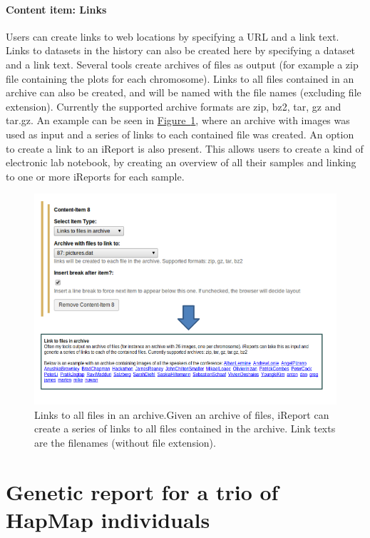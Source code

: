 \paragraph*{Content item: Links}
Users can create links to web locations by specifying a URL and a link text. Links to datasets in the history can also be created here by specifying a dataset and a link text. Several tools create archives of files as output (for example a zip file containing the plots for each chromosome). Links to all files contained in an archive can also be created, and will be named with the file names (excluding file extension). Currently the supported archive formats are zip, bz2, tar, gz and tar.gz. An example can be seen in \hyperref[fig:archivelinks]{Figure~\ref*{fig:archivelinks}}, where an archive with images was used as input and a series of links to each contained file was created. An option to create a link to an iReport is also present. This allows users to create a kind of electronic lab notebook, by creating an overview of all their samples and linking to one or more iReports for each sample.

\begin{figure}[h!]
    \includegraphics[width=\textwidth]{chapters/images/iReport/Hiltemann_archivelinks.jpg}
    \caption{Links to all files in an archive.Given an archive of files, iReport can create a series of links to all files contained in the archive. Link texts are the filenames (without file extension).}
    \label{fig:archivelinks}
\end{figure}

\section*{Genetic report for a trio of HapMap individuals}

